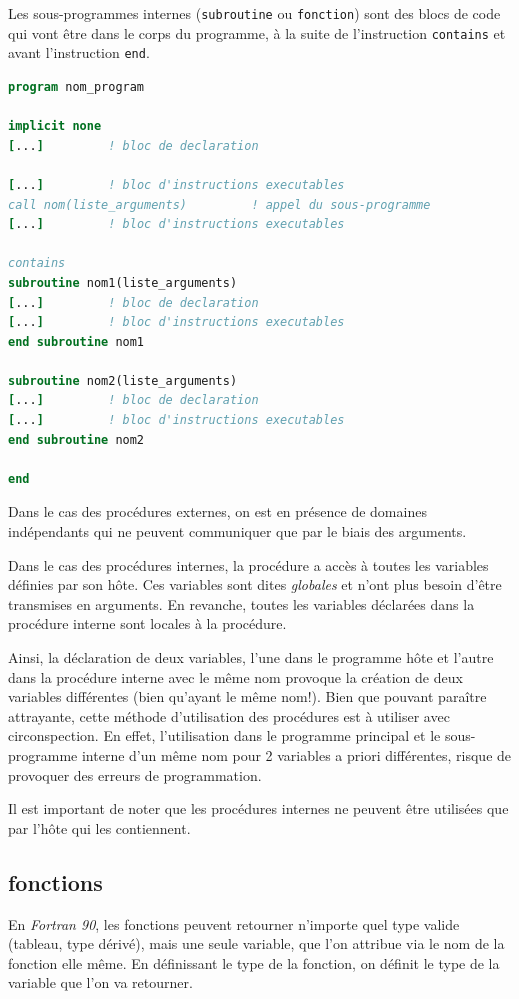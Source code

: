 \documentclass[a4paper,twoside]{article}
\begin{document}
Les sous-programmes internes (\texttt{subroutine} ou \texttt{fonction}) sont des blocs de code qui vont être dans le corps du programme, à la suite de l'instruction \texttt{contains} et avant l'instruction \texttt{end}.
\begin{lstlisting}[language=Fortran]
program nom_program
 
implicit none 
[...]         ! bloc de declaration
 
[...]         ! bloc d'instructions executables 
call nom(liste_arguments)         ! appel du sous-programme 
[...]         ! bloc d'instructions executables 

contains 
subroutine nom1(liste_arguments) 
[...]         ! bloc de declaration 
[...]         ! bloc d'instructions executables 
end subroutine nom1 

subroutine nom2(liste_arguments) 
[...]         ! bloc de declaration 
[...]         ! bloc d'instructions executables 
end subroutine nom2 

end
\end{lstlisting}

Dans le cas des procédures externes, on est en présence de domaines indépendants qui ne peuvent communiquer que par le biais des arguments. 

Dans le cas des procédures internes, la procédure a accès à toutes les variables définies par son hôte. Ces variables sont dites \emph{globales} et n'ont plus besoin d'être transmises en arguments. En revanche, toutes les variables déclarées dans la procédure interne sont locales à la procédure. 

Ainsi, la déclaration de deux variables, l'une dans le programme hôte et l'autre dans la procédure interne avec le même nom provoque la création de deux variables différentes (bien qu'ayant le même nom!). Bien que pouvant paraître attrayante, cette méthode d'utilisation des procédures est à utiliser avec circonspection. En effet, l'utilisation dans le programme principal et le sous-programme interne d'un même nom pour 2 variables a priori différentes, risque de provoquer des erreurs de programmation. 


\begin{attention}
Il est important de noter que les procédures internes ne peuvent être utilisées que par l'hôte qui les contiennent. 
\end{attention}

\subsection{fonctions}
En \emph{Fortran 90}, les fonctions peuvent retourner n'importe quel type valide (tableau, type dérivé), mais une seule variable, que l'on attribue via le nom de la fonction elle même. En définissant le type de la fonction, on définit le type de la variable que l'on va retourner.
\end{document}
